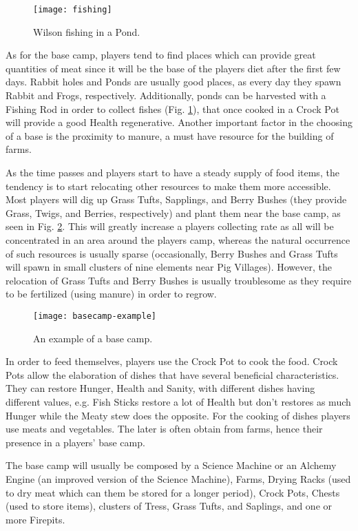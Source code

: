 \begin{figure}
  \centering
    \texttt{[image: fishing]}
  \caption{Wilson fishing in a Pond.}
  \label{fig:fishing}
\end{figure}

As for the base camp, players tend to find places which can provide great quantities of meat since it will be the base of the players diet after the first few days.
Rabbit holes and Ponds are usually good places, as every day they spawn Rabbit and Frogs, respectively.
Additionally, ponds can be harvested with a Fishing Rod in order to collect fishes (Fig. \ref{fig:fishing}), that once cooked in a Crock Pot will provide a good Health regenerative.
Another important factor in the choosing of a base is the proximity to manure, a must have resource for the building of farms.

As the time passes and players start to have a steady supply of food items, the tendency is to start relocating other resources to make them more accessible.
Most players will dig up Grass Tufts, Sapplings, and Berry Bushes (they provide Grass, Twigs, and Berries, respectively) and plant them near the base camp, as seen in Fig. \ref{fig:basecamp-example}.
This will greatly increase a players collecting rate as all will be concentrated in an area around the players camp, whereas the natural occurrence of such resources is usually sparse (occasionally, Berry Bushes and Grass Tufts will spawn in small clusters of nine elements near Pig Villages).
However, the relocation of Grass Tufts and Berry Bushes is usually troublesome as they require to be fertilized (using manure) in order to regrow.

\begin{figure}
  \centering
    \texttt{[image: basecamp-example]}
  \caption{An example of a base camp.}
  \label{fig:basecamp-example}
\end{figure}

In order to feed themselves, players use the Crock Pot to cook the food.
Crock Pots allow the elaboration of dishes that have several beneficial characteristics.
They can restore Hunger, Health and Sanity, with different dishes having different values, e.g. Fish Sticks restore a lot of Health but don't restores as much Hunger while the Meaty stew does the opposite.
For the cooking of dishes players use meats and vegetables.
The later is often obtain from farms, hence their presence in a players' base camp.

The base camp will usually be composed by a Science Machine or an Alchemy Engine (an improved version of the Science Machine), Farms, Drying Racks (used to dry meat which can them be stored for a longer period), Crock Pots, Chests (used to store items), clusters of Tress, Grass Tufts, and Saplings, and one or more Firepits.

